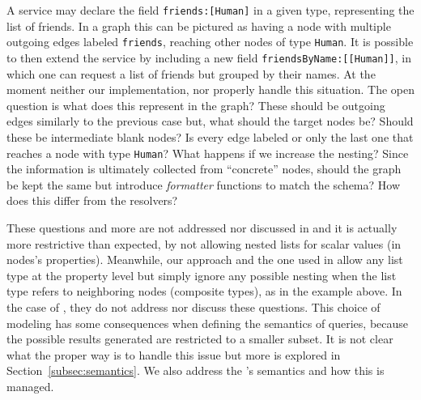 A service may declare the field \texttt{friends:[Human]} in a given type, representing the list of friends.
In a graph this can be pictured as having a node with multiple outgoing edges labeled \texttt{friends}, reaching other nodes of type \texttt{Human}. It is possible to then extend the service by including a new field \texttt{friendsByName:[[Human]]}, in which one can request a list of friends but grouped by their names. At the moment neither our implementation, \HP nor \cite{olafschema} properly handle this situation. The open question is what does this represent in the graph? These should be outgoing edges similarly to the previous case but, what should the target nodes be? Should these be intermediate blank nodes? Is every edge labeled or only the last one that reaches a node with type \texttt{Human}? What happens if we increase the nesting? Since the information is ultimately collected from ``concrete'' nodes, should the graph be kept the same but introduce \textit{formatter} functions to match the schema? How does this differ from the \gql resolvers?

These questions and more  are not addressed nor discussed in \HP and it is actually more restrictive than expected, by not allowing nested lists for scalar values (in nodes's properties). Meanwhile, our approach and the one used in \cite{olafschema} allow any list type at the property level but simply ignore any possible nesting when the list type refers to neighboring nodes (composite types), as in the example above.
In the case of \cite{olafschema}, they do not address nor discuss these questions. This choice of modeling has some consequences when defining the semantics of \gql queries, because the possible results generated are restricted to a smaller subset. It is not clear what the proper way is to handle this issue but more is explored in Section~\ref{subsec:semantics}. 
We also address the \spec's semantics and how this is managed.

